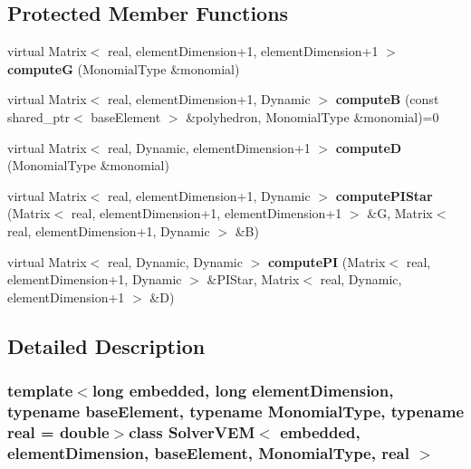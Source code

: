 \subsection*{\-Protected \-Member \-Functions}
\begin{DoxyCompactItemize}
\item 
\hypertarget{class_solver_v_e_m_a65980d6c3c850f5e8d037a9761438e93}{virtual \-Matrix$<$ real, \*
element\-Dimension+1, \*
element\-Dimension+1 $>$ {\bfseries compute\-G} (\-Monomial\-Type \&monomial)}\label{class_solver_v_e_m_a65980d6c3c850f5e8d037a9761438e93}

\item 
\hypertarget{class_solver_v_e_m_a512de296031ac2f954f95c2e78da063d}{virtual \-Matrix$<$ real, \*
element\-Dimension+1, \-Dynamic $>$ {\bfseries compute\-B} (const shared\-\_\-ptr$<$ base\-Element $>$ \&polyhedron, \-Monomial\-Type \&monomial)=0}\label{class_solver_v_e_m_a512de296031ac2f954f95c2e78da063d}

\item 
\hypertarget{class_solver_v_e_m_a73bb74a85b8b436e8e24ed874c8c2ef9}{virtual \-Matrix$<$ real, \-Dynamic, \*
element\-Dimension+1 $>$ {\bfseries compute\-D} (\-Monomial\-Type \&monomial)}\label{class_solver_v_e_m_a73bb74a85b8b436e8e24ed874c8c2ef9}

\item 
\hypertarget{class_solver_v_e_m_a9f092078e8698d00c862e53cae1e20e1}{virtual \-Matrix$<$ real, \*
element\-Dimension+1, \-Dynamic $>$ {\bfseries compute\-P\-I\-Star} (\-Matrix$<$ real, element\-Dimension+1, element\-Dimension+1 $>$ \&\-G, \-Matrix$<$ real, element\-Dimension+1, \-Dynamic $>$ \&\-B)}\label{class_solver_v_e_m_a9f092078e8698d00c862e53cae1e20e1}

\item 
\hypertarget{class_solver_v_e_m_a8d296a88bc9f863fe72688cad49ef2a3}{virtual \-Matrix$<$ real, \-Dynamic, \*
\-Dynamic $>$ {\bfseries compute\-P\-I} (\-Matrix$<$ real, element\-Dimension+1, \-Dynamic $>$ \&\-P\-I\-Star, \-Matrix$<$ real, \-Dynamic, element\-Dimension+1 $>$ \&\-D)}\label{class_solver_v_e_m_a8d296a88bc9f863fe72688cad49ef2a3}

\end{DoxyCompactItemize}


\subsection{\-Detailed \-Description}
\subsubsection*{template$<$long embedded, long element\-Dimension, typename base\-Element, typename \-Monomial\-Type, typename real = double$>$class Solver\-V\-E\-M$<$ embedded, element\-Dimension, base\-Element, Monomial\-Type, real $>$}


